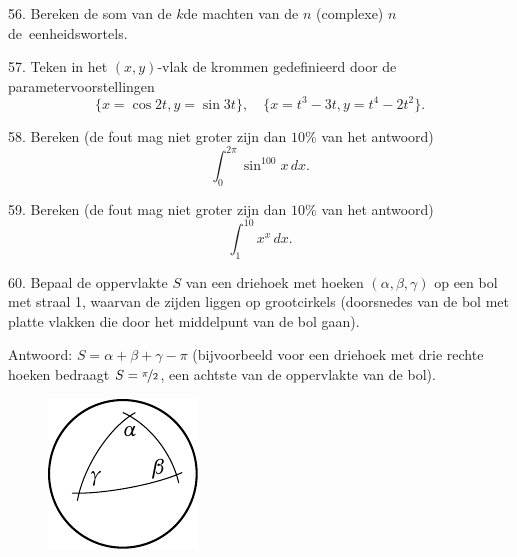 \begin{problem}{56.}
	Bereken de som van de $k$de machten van de $n$ (complexe) $n$de~een\-heidswortels.
\end{problem}

\begin{problem}{57.}
	Teken in het $(x,y)$-vlak de krommen gedefinieerd door de para\-metervoorstellingen
	\begin{equation*}
		\{x=\cos 2t, y=\sin 3t\},\quad
		\{x=t^3-3t, y=t^4-2t^2\}.
	\end{equation*}
\end{problem}

\begin{problem}{58.}
	Bereken (de fout mag niet groter zijn dan $10\%$ van het antwoord)
	\begin{equation*}
		\int_0^{2\pi} \sin^{100} x\,dx.
	\end{equation*}
\end{problem}

\begin{problem}{59.}
	Bereken (de fout mag niet groter zijn dan $10\%$ van het antwoord)
	\begin{equation*}
		\int_1^{10} x^x\,dx.
	\end{equation*}
\end{problem}

\begin{problem}{60.}
	Bepaal de oppervlakte $S$ van een driehoek met hoeken $(\alpha,\beta,\gamma)$ op een bol met straal 1, waarvan de zijden liggen op grootcirkels (doorsnedes van de bol met platte vlakken die door het middelpunt van de bol gaan).
\\
	\begin{note}{Antwoord:}
		$S=\alpha+\beta+\gamma-\pi$ (bijvoorbeeld voor een driehoek met drie rechte hoeken bedraagt $S=\nicefrac{\pi}{2}$, een achtste van de oppervlakte van de bol).
	\end{note}
	\begin{figure}
		\null\hfill
		\includegraphics{resources/taskbook-44}
		\hfill\null
	\end{figure}
\end{problem}


